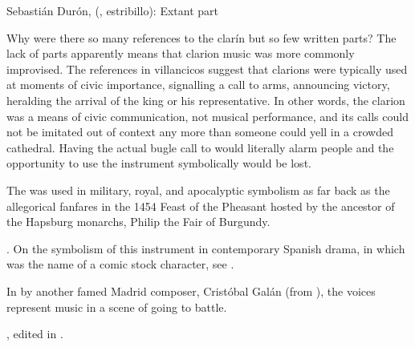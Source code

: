 {Sebastián Durón,  (, estribillo):
Extant  part}

Why were there so many references to the clarín but so few written parts?
The lack of parts apparently means that clarion music was more commonly
improvised.  
The references in villancicos suggest that clarions were typically used at
moments of civic importance, signalling a call to arms, announcing victory,
heralding the arrival of the king or his representative.
In other words, the clarion was a means of civic communication, not musical
performance, and its calls could not be imitated out of context any more than
someone could yell  in a crowded cathedral.
Having the actual bugle call to would literally alarm people and the
opportunity to use the instrument symbolically would be lost.

The  was used in military, royal, and apocalyptic symbolism as far
back as the allegorical  fanfares in the 1454 Feast of the
Pheasant hosted by the ancestor of the Hapsburg monarchs, Philip the Fair of
Burgundy.%
\begin{Footnote}
    \Autocites
    [340--380]{LaMarche:Memoires}
    {Bloxam:JNV}
    {Perkins:Patronage15C}.
    On the symbolism of this instrument in contemporary Spanish drama, in which
     was the name of a comic stock character, see
    \autocite{Damjanovic:Clarin}.
\end{Footnote}
In  by another famed Madrid composer, Cristóbal
Galán (from ), the voices represent  music in a scene
of  going to battle.%
\begin{Footnote} 
    , 
    edited in \autocite[555--565]{CaberoPueyo:PhD}.
\end{Footnote}


